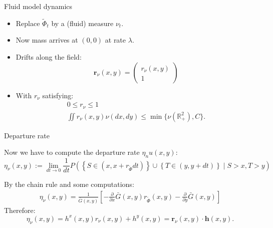 \documentclass[aspectratio=169]{beamer}
\newcommand{\R}{\mathbb{R}}
\begin{document}
\begin{frame}{Fluid model dynamics}

	\begin{itemize}
		\item Replace $\tilde{\Phi}_t$ by a (fluid) measure $\nu_t$.
		\item Now mass arrives at $(0,0)$ at rate $\lambda$.
		\item Drifts along the field:
		 \begin{equation*}
			\mathbf{r}_\nu(x,y) = \begin{pmatrix}
				r_\nu (x,y) \\ 1
			\end{pmatrix}
		 \end{equation*}
		 \item With $r_\nu$ satisfying:
		 \begin{gather*}
			0\leqslant r_\nu \leqslant 1 \\
			\iint r_\nu(x,y) \nu(dx,dy) \leqslant \min\{\nu(\R^2_+),C\}.
		 \end{gather*}
	\end{itemize}
\end{frame}

\begin{frame}{Departure rate}

	Now we have to compute the departure rate $\eta_nu(x,y)$:
	\begin{equation*}
		\eta_\nu(x,y) := \lim_{dt\to 0} \frac{1}{dt} P\left(\left\{S\in\left(x,x+r_{\tilde\Phi}dt\right)\right\}\cup \left\{T\in\left(y,y+dt\right)\right\}\mid S>x,T>y\right)
	\end{equation*}

	By the chain rule and some computations:
	\begin{gather*}
		\eta_{\nu}(x,y) =\frac{1}{\bar{G}(x,y)}\left[-\frac{\partial}{\partial x} \bar{G}(x,y) r_{\tilde\Phi}(x,y) - \frac{\partial}{\partial y} \bar{G}(x,y)\right]
	\end{gather*}
	\pause
	Therefore:
	\begin{equation*}
	\eta_{\nu}(x,y) = h^x(x,y)r_{\nu}(x,y)+h^y(x,y) = \mathbf{r}_{\nu}(x,y) \cdot \mathbf{h}(x,y).
	\end{equation*}

\end{frame}
\end{document}
